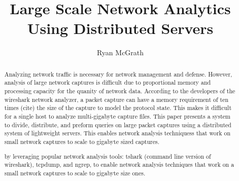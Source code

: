 \documentclass{article}
\begin{document}
\title{Large Scale Network Analytics Using Distributed Servers}
\author{Ryan McGrath}
\maketitle

\begin{abstract}

  Analyzing network traffic is necessary for network management and defense. However, analysis of large network captures is difficult due to proportional memory and processing capacity for the quanity of network data. According to the developers of the wireshark network analyzer, a packet capture can have a memory requirement of ten times (cite) the size of the capture to model the protocol state.  This makes it difficult for a single host to analyze multi-gigabyte capture files.  This paper presents a system to divide, distribute, and preform queries on large packet captures using a distributed system of lightweight servers. This enables network analysis techniquess that work on small network captures to scale to gigabyte sized captures.

by leveraging popular network analysis tools: tshark (command line version of wireshark), tcpdump, and ngrep, to enable network analysis techniques that work on a small network captures to scale to gigabyte size ones.   


\end{abstract}
\end{document}

